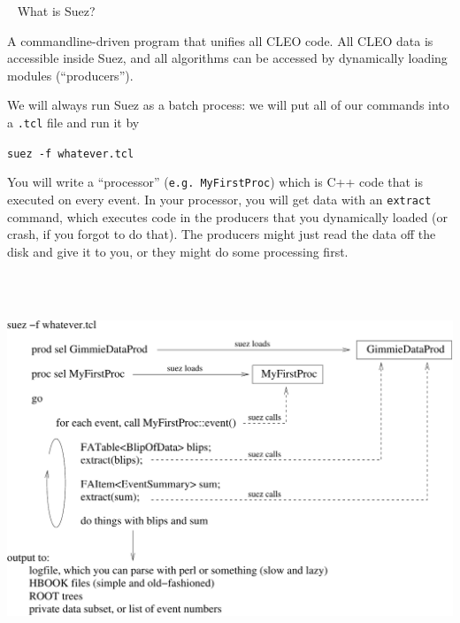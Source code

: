\documentclass[landscape]{article}
\newenvironment{slide}{\mbox{ }\vfill}{\vfill \mbox{ } \pagebreak}
\begin{document}
\begin{slide}
What is Suez?

\vspace{1 cm}
\begin{center}
  \begin{minipage}{0.9\linewidth}
    A commandline-driven program that unifies all CLEO code.  All CLEO
    data is accessible inside Suez, and all algorithms can be accessed
    by dynamically loading modules (``producers'').

    \vspace{1 cm}
    We will always run Suez as a batch process: we will put all of our
    commands into a {\tt .tcl} file and run it by
    \begin{center} \tt suez -f whatever.tcl \end{center}

    \vspace{1 cm}
    You will write a ``processor'' ({\tt e.g.\ MyFirstProc}) which is
    C++ code that is executed on every event.  In your processor, you
    will get data with an {\tt extract} command, which executes code
    in the producers that you dynamically loaded (or crash, if you
    forgot to do that).  The producers might just read the data off
    the disk and give it to you, or they might do some processing
    first.
  \end{minipage}
\end{center}
\end{slide}

\begin{slide}
  \includegraphics[width=\linewidth]{suezwork}
\end{slide}
\end{document}
